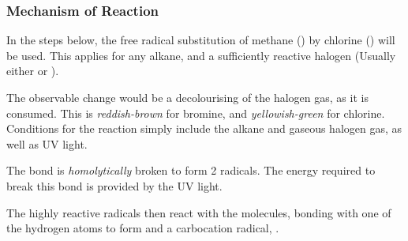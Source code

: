 	\subsubsection{Mechanism of Reaction}

		In the steps below, the free radical substitution of methane () by chlorine () will be used. This applies
		for any alkane, and a sufficiently reactive halogen (Usually either \ch{\chlorine} or ).

		The observable change would be a decolourising of the halogen gas, as it is consumed. This is \textit{\color{Mahogany}reddish-brown}
		for bromine, and \textit{\color{YellowGreen}yellowish-green} for chlorine. Conditions for the reaction simply include the alkane
		and gaseous halogen gas, as well as UV light.


			The \ch{\chlorine-\chlorine} bond is \textit{homolytically} broken to form 2 \ch{\chlorine} radicals.
			The energy required to break this bond is provided by the UV light.




			The highly reactive \ch{\chlorine} radicals then react with the  molecules, bonding with one of the
			hydrogen atoms to form  and a carbocation radical, .


